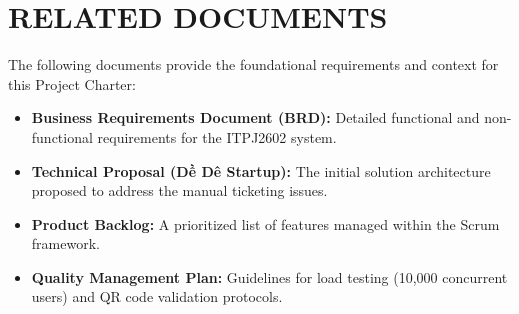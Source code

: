 \chapter{RELATED DOCUMENTS}

The following documents provide the foundational requirements and context for this Project Charter:

\begin{itemize}
    \item \textbf{Business Requirements Document (BRD):} Detailed functional and non-functional requirements for the ITPJ2602 system.
    \item \textbf{Technical Proposal (Dề Dê Startup):} The initial solution architecture proposed to address the manual ticketing issues.
    \item \textbf{Product Backlog:} A prioritized list of features managed within the Scrum framework.
    \item \textbf{Quality Management Plan:} Guidelines for load testing (10,000 concurrent users) and QR code validation protocols.
\end{itemize}
